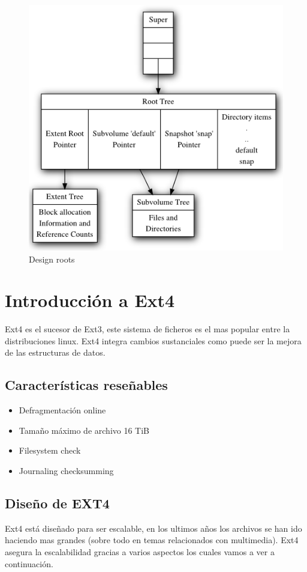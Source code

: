 \begin{figure}[H]
    \centering
    \includegraphics[scale=0.6]{doc/assets/images/btrfs/Design-roots.png}
    \caption{Design roots}
    \label{fig:my_label}
\end{figure}


\section{Introducción a Ext4}
Ext4 es el sucesor de Ext3, este sistema de ficheros es el mas popular entre la distribuciones linux. Ext4 integra cambios sustanciales como puede ser la mejora de las estructuras de datos.

\subsection{Características reseñables}
\begin{itemize}
    \item Defragmentación online
    \item Tamaño máximo de archivo 16 TiB
    \item Filesystem check
    \item Journaling checksumming
\end{itemize}


\subsection{Diseño de EXT4}
Ext4 está diseñado para ser escalable, en los ultimos años los archivos se han ido haciendo mas grandes (sobre todo en temas relacionados con multimedia). Ext4 asegura la escalabilidad gracias a varios aspectos los cuales vamos a ver a continuación.\\

